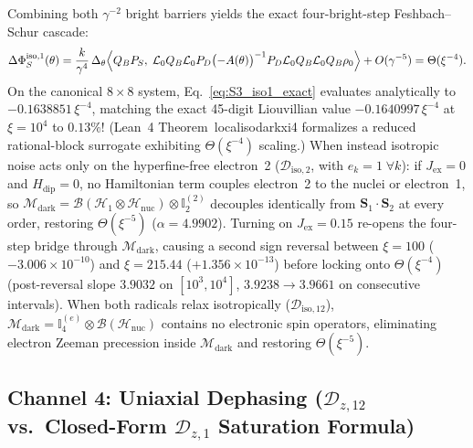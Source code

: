 \documentclass[onecolumn,10pt,notitlepage,amsmath,amssymb,floatfix]{revtex4-2}
\theoremstyle{plain}
\theoremstyle{definition}
\newcommand{\PS}{P_S}
\newcommand{\Hdip}{H_{\mathrm{dip}}}
\newcommand{\DeltaPhi}{\Delta\Phi_S}
\newcommand{\leanid}[1]{{\footnotesize\ttfamily\def\_{\textunderscore\allowbreak}#1}}
\begin{document}
Combining both $\gamma^{-2}$ bright barriers yields the exact four-bright-step Feshbach--Schur cascade:
\begin{equation}
\label{eq:S3_iso1_exact}
\DeltaPhi^{\mathrm{iso},1}(\theta) = \frac{k}{\gamma^4}\,\Delta_\theta\Bigl\langle Q_B\PS,\; \mathcal{L}_0 Q_B \mathcal{L}_0 P_D \bigl(-A(\theta)\bigr)^{-1} P_D \mathcal{L}_0 Q_B \mathcal{L}_0 Q_B \rho_0 \Bigr\rangle + O(\gamma^{-5}) = \Theta(\xi^{-4}).
\end{equation}
On the canonical $8\times 8$ system, Eq.~\eqref{eq:S3_iso1_exact} evaluates analytically to $-0.1638851\,\xi^{-4}$, matching the exact 45-digit Liouvillian value $-0.1640997\,\xi^{-4}$ at $\xi = 10^4$ to $0.13\%$! (Lean~4 Theorem~\leanid{local\_iso\_dark\_xi4} formalizes a reduced rational-block surrogate exhibiting $\Theta(\xi^{-4})$ scaling.)
When instead isotropic noise acts only on the hyperfine-free electron~2 ($\mathcal{D}_{\mathrm{iso},2}$, with $e_k = 1\;\forall k$): if $J_{\mathrm{ex}} = 0$ and $\Hdip = 0$, no Hamiltonian term couples electron~2 to the nuclei or electron~1, so $\mathcal{M}_{\mathrm{dark}} = \mathcal{B}(\mathcal{H}_1\otimes\mathcal{H}_{\mathrm{nuc}})\otimes\mathbb{I}_2^{(2)}$ decouples identically from $\mathbf{S}_1\cdot\mathbf{S}_2$ at every order, restoring $\Theta(\xi^{-5})$ ($\alpha = 4.9902$). Turning on $J_{\mathrm{ex}} = 0.15$ re-opens the four-step bridge through $\mathcal{M}_{\mathrm{dark}}$, causing a second sign reversal between $\xi = 100$ ($-3.006\times 10^{-10}$) and $\xi = 215.44$ ($+1.356\times 10^{-13}$) before locking onto $\Theta(\xi^{-4})$ (post-reversal slope $3.9032$ on $[10^3, 10^4]$, $3.9238 \to 3.9661$ on consecutive intervals). When both radicals relax isotropically ($\mathcal{D}_{\mathrm{iso},12}$), $\mathcal{M}_{\mathrm{dark}} = \mathbb{I}_4^{(e)} \otimes \mathcal{B}(\mathcal{H}_{\mathrm{nuc}})$ contains no electronic spin operators, eliminating electron Zeeman precession inside $\mathcal{M}_{\mathrm{dark}}$ and restoring $\Theta(\xi^{-5})$.

\subsection{Channel 4: Uniaxial Dephasing (\texorpdfstring{$\mathcal{D}_{z,12}$}{D\_z,12} vs.\ Closed-Form \texorpdfstring{$\mathcal{D}_{z,1}$}{D\_z,1} Saturation Formula)}
\end{document}
